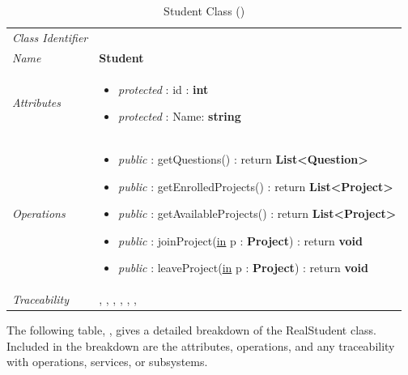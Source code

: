 \documentclass[12pt,letterpaper]{article}
\begin{document}
\begin{table}[H]
    \caption{Student Class ()} 
	\begin{tabu} to 
		\toprule
		Class Identifier &  \\
		Name & {\bf Student} \\
		Attributes & 
		\begin{minipage}[t]{\linewidth}
		    \begin{itemize}
		        \item \textit{protected} : id : {\bf int}
		        \item \textit{protected} : Name: {\bf string}
			\end{itemize}
	    \end{minipage} \\

		Operations &
		\begin{minipage}[t]{\linewidth}
			\begin{itemize}
			    \item {\it public} : getQuestions() : return {\bf List<Question>}
			    \item {\it public} : getEnrolledProjects() : return {\bf List<Project>}
			    \item {\it public} : getAvailableProjects() : return {\bf List<Project>}
			    \item {\it public} : joinProject(\underline{in} p : {\bf Project}) : return {\bf void}
			    \item {\it public} : leaveProject(\underline{in} p : {\bf Project}) : return {\bf void}
	        \end{itemize}
	    \end{minipage} \\
	    	Traceability & , , , , , , \\
		\toprule
	\end{tabu}
\end{table}

The following table, , gives a detailed breakdown of the RealStudent class. Included in the breakdown are the attributes, operations, and any traceability with operations, services, or subsystems.
\end{document}

